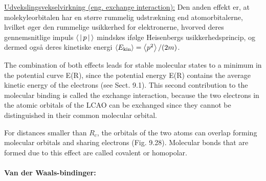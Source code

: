 \underline{Udvekslingsvekselvirkning (eng. exchange interaction):} Den anden effekt er, at molekyleorbitalen har en større rummelig udstrækning end atomorbitalerne, hvilket øger den rummelige usikkerhed for elektronerne, hvorved deres gennemsnitlige impuls $\Braket{|p|}$ mindskes ifølge Heisenbergs usikkerhedsprincip, og dermed også deres kinetiske energi $\Braket{E_\text{kin}} = \Braket{p^2}/(2m)$.




The combination of both effects leads
for stable molecular states to a minimum in the potential
curve E(R), since the potential energy E(R)
contains the average kinetic energy of the electrons (see
Sect. 9.1). This second contribution to the molecular
binding is called the exchange interaction, because the
two electrons in the atomic orbitals of the LCAO can be
exchanged since they cannot be distinguished in their
common molecular orbital.

For distances smaller than $R_c$, the orbitals of
the two atoms can overlap forming molecular orbitals
and sharing electrons (Fig. 9.28). Molecular bonds that
are formed due to this effect are called covalent or
homopolar.



\paragraph{Van der Waals-bindinger:}